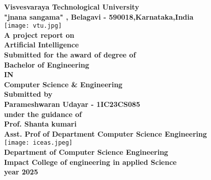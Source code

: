 \documentclass[12pt,a4paper]{article}
\begin{document}
\begin{titlepage}
\begin{center}
{\LARGE \textbf {Visvesvaraya Technological University}} \\
\vspace{0.3cm}
{\large \textbf{"jnana sangama" , Belagavi - 590018,Karnataka,India}}\\
\vspace{0.5cm}
\texttt{[image: vtu.jpg]} \\
\vspace{0.5cm}
{\large \textbf{A project report on }} \\
\vspace{0.5cm}
{\color{red}\LARGE \textbf{Artificial Intelligence}} \\
\vspace{0.5cm}
{\color{green} \large \textbf{Submitted for the award of degree of}} \\
\vspace{0.5cm}
{\color{blue} \large \textbf{Bachelor of Engineering}} \\
\vspace{0.5cm}
{\color{blue} \large \textbf{IN}} \\
\vspace{0.5cm}
{\color{blue} \large \textbf{Computer Science \& Engineering}} \\
\vspace{0.5cm}
{\large \textbf{Submitted by}} \\
\vspace{0.5cm}
{\large \textbf{Parameshwaran Udayar - 1IC23CS085}} \\
\vspace{0.5cm}
{\color{red} \large \textbf{under the guidance of}} \\
\vspace{0.5cm}
{\large \textbf{Prof. Shanta kumari}} \\
\vspace{0.3cm}
{\textbf{Asst. Prof of Department Computer Science Engineering}} \\
\vspace{0.2cm}
\texttt{[image: iceas.jpeg]} \\
{\large \textbf{Department of Computer Science Engineering}} \\
\vspace{0.2cm}
{\large \textbf{Impact College of engineering in applied Science}} \\
\vspace{0.2cm}
{\textbf{year 2025}} \\
\vspace{0.2cm}
\end{center}
\end{titlepage}
\end{document}
